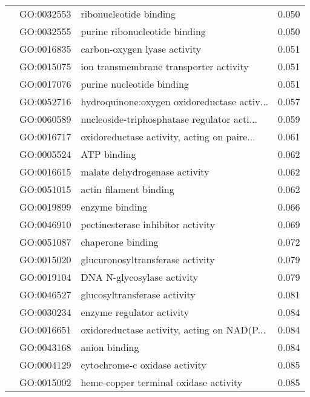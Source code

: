 \begin{longtable}{lllr}
   & GO:0032553 &                       ribonucleotide binding &         0.050 \\
   & GO:0032555 &                purine ribonucleotide binding &         0.050 \\
   & GO:0016835 &                 carbon-oxygen lyase activity &         0.051 \\
   & GO:0015075 &       ion transmembrane transporter activity &         0.051 \\
   & GO:0017076 &                    purine nucleotide binding &         0.051 \\
   & GO:0052716 &  hydroquinone:oxygen oxidoreductase activ... &         0.057 \\
   & GO:0060589 &  nucleoside-triphosphatase regulator acti... &         0.059 \\
   & GO:0016717 &  oxidoreductase activity, acting on paire... &         0.061 \\
   & GO:0005524 &                                  ATP binding &         0.062 \\
   & GO:0016615 &                malate dehydrogenase activity &         0.062 \\
   & GO:0051015 &                       actin filament binding &         0.062 \\
   & GO:0019899 &                               enzyme binding &         0.066 \\
   & GO:0046910 &            pectinesterase inhibitor activity &         0.069 \\
   & GO:0051087 &                            chaperone binding &         0.072 \\
   & GO:0015020 &             glucuronosyltransferase activity &         0.079 \\
   & GO:0019104 &                   DNA N-glycosylase activity &         0.079 \\
   & GO:0046527 &                 glucosyltransferase activity &         0.081 \\
   & GO:0030234 &                    enzyme regulator activity &         0.084 \\
   & GO:0016651 &  oxidoreductase activity, acting on NAD(P... &         0.084 \\
   & GO:0043168 &                                anion binding &         0.084 \\
   & GO:0004129 &                cytochrome-c oxidase activity &         0.085 \\
   & GO:0015002 &        heme-copper terminal oxidase activity &         0.085 \\

\end{longtable}

